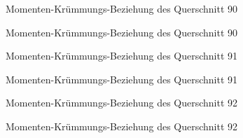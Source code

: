 \documentclass[
  11pt,
  letterpaper,
]{scrreprt}
\begin{document}
\begin{figure}[H]


\caption{\label{fig-qs_90}Momenten-Krümmungs-Beziehung des Querschnitt
90}

\end{figure}%

\begin{figure}[H]


\caption{\label{fig-m_chi_90}Momenten-Krümmungs-Beziehung des
Querschnitt 90}

\end{figure}%

\begin{figure}[H]


\caption{\label{fig-qs_91}Momenten-Krümmungs-Beziehung des Querschnitt
91}

\end{figure}%

\begin{figure}[H]


\caption{\label{fig-m_chi_91}Momenten-Krümmungs-Beziehung des
Querschnitt 91}

\end{figure}%

\begin{figure}[H]


\caption{\label{fig-qs_92}Momenten-Krümmungs-Beziehung des Querschnitt
92}

\end{figure}%

\begin{figure}[H]


\caption{\label{fig-m_chi_92}Momenten-Krümmungs-Beziehung des
Querschnitt 92}

\end{figure}%
\end{document}
